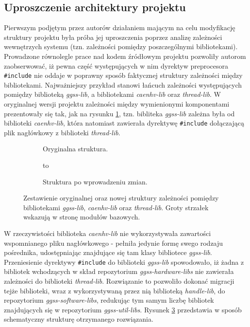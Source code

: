 \subsection{Uproszczenie architektury projektu}
Pierwszym podjętym przez autorów działaniem mającym na celu modyfikację struktury projektu była próba jej uproszczenia poprzez analizę zależności wewnętrzych systemu (tzn. zależności pomiędzy poszczególnymi bibliotekami). Prowadzone równolegle prace nad kodem źródłowym projektu pozwoliły autorom zaobserwować, iż pewna część występujących w nim dyrektyw preprocesora \lstinline{#include} nie oddaje w poprawny sposób faktycznej struktury zależności między bibliotekami. Najważniejszy przykład stanowi łańcuch zależności występujących pomiędzy biblioteką \emph{ggss-lib}, a bibliotekami \emph{caenhv-lib} oraz \emph{thread-lib}. W oryginalnej wersji projektu zależności między wymienionymi komponentami prezentowały się tak, jak na rysunku \ref{fig:dependency_problem_old}, tzn. bibliteka \emph{ggss-lib} zależna była od biblioteki \emph{caenhv-lib}, która natomiast zawierała dyrektywę \lstinline{#include} dołączającą plik nagłówkowy z biblioteki \emph{thread-lib}.



\begin{figure}[H]
\centering
\begin{subfigure}[t]{0.40\textwidth}
\centering
\usebox{\mybox}
\caption{Oryginalna struktura.}
\label{fig:dependency_problem_old}
\end{subfigure}
\hfill
\begin{subfigure}[t]{0.55\textwidth}
\centering
\vbox to \ht{}
\caption{Struktura po wprowadzeniu zmian.}
\label{fig:dependency_problem_solved}
\end{subfigure}

\caption{Zestawienie oryginalnej oraz nowej struktury zależności pomiędzy bibliotekami \emph{ggss-lib}, \emph{caenhv-lib} oraz \emph{thread-lib}. Groty strzałek wskazują w stronę modułów bazowych.}
\end{figure}

W rzeczywistości biblioteka \emph{caenhv-lib} nie wykorzystywała zawartości wspomnianego pliku nagłówkowego - pełniła jedynie formę swego rodzaju pośrednika, udostępniając znajdujące się tam klasy bibliotece \emph{ggss-lib}. Przeniesienie dyrektywy \lstinline{#include} do biblioteki \emph{ggss-lib} spowodowało, iż żadna z bibliotek wchodzących w skład repozytorium \emph{ggss-hardware-libs} nie zawierała zależności do biblioteki \emph{thread-lib}. Rozwiązanie to pozwoliło dokonać migracji tejże biblioteki, wraz z wykorzystywaną przez nią biblioteką \emph{handle-lib}, do repozytorium \emph{ggss-software-libs}, redukując tym samym liczbę bibliotek znajdujących się w repozytorium \emph{ggss-util-libs}. Rysunek \ref{fig:dependency_problem_solved} przedstawia w sposób schematyczny strukturę otrzymanego rozwiązania.


